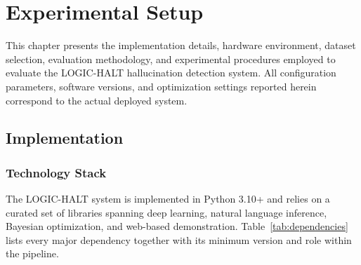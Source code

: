 \chapter{Experimental Setup}

This chapter presents the implementation details, hardware environment, dataset selection, evaluation methodology, and experimental procedures employed to evaluate the LOGIC-HALT hallucination detection system. All configuration parameters, software versions, and optimization settings reported herein correspond to the actual deployed system.

\section{Implementation}

\subsection{Technology Stack}

The LOGIC-HALT system is implemented in Python 3.10+ and relies on a curated set of libraries spanning deep learning, natural language inference, Bayesian optimization, and web-based demonstration. Table~\ref{tab:dependencies} lists every major dependency together with its minimum version and role within the pipeline.


